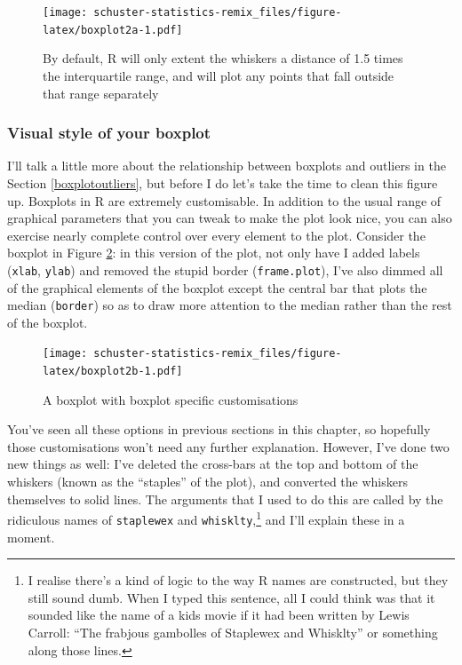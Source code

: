 \documentclass[
]{book}
\begin{document}
\begin{figure}
\centering
\texttt{[image: schuster-statistics-remix\_files/figure-latex/boxplot2a-1.pdf]}
\caption{\label{fig:boxplot2a}By default, R will only extent the whiskers a distance of 1.5 times the interquartile range, and will plot any points that fall outside that range separately}
\end{figure}

\hypertarget{visual-style-of-your-boxplot}{%
\subsubsection{Visual style of your boxplot}\label{visual-style-of-your-boxplot}}

I'll talk a little more about the relationship between boxplots and outliers in the Section \ref{boxplotoutliers}, but before I do let's take the time to clean this figure up. Boxplots in R are extremely customisable. In addition to the usual range of graphical parameters that you can tweak to make the plot look nice, you can also exercise nearly complete control over every element to the plot. Consider the boxplot in Figure \ref{fig:boxplot2b}: in this version of the plot, not only have I added labels (\texttt{xlab}, \texttt{ylab}) and removed the stupid border (\texttt{frame.plot}), I've also dimmed all of the graphical elements of the boxplot except the central bar that plots the median (\texttt{border}) so as to draw more attention to the median rather than the rest of the boxplot.

\begin{figure}
\centering
\texttt{[image: schuster-statistics-remix\_files/figure-latex/boxplot2b-1.pdf]}
\caption{\label{fig:boxplot2b}A boxplot with boxplot specific customisations}
\end{figure}

You've seen all these options in previous sections in this chapter, so hopefully those customisations won't need any further explanation. However, I've done two new things as well: I've deleted the cross-bars at the top and bottom of the whiskers (known as the ``staples'' of the plot), and converted the whiskers themselves to solid lines. The arguments that I used to do this are called by the ridiculous names of \texttt{staplewex} and \texttt{whisklty},\footnote{I realise there's a kind of logic to the way R names are constructed, but they still sound dumb. When I typed this sentence, all I could think was that it sounded like the name of a kids movie if it had been written by Lewis Carroll: ``The frabjous gambolles of Staplewex and Whisklty'' or something along those lines.} and I'll explain these in a moment.
\end{document}
